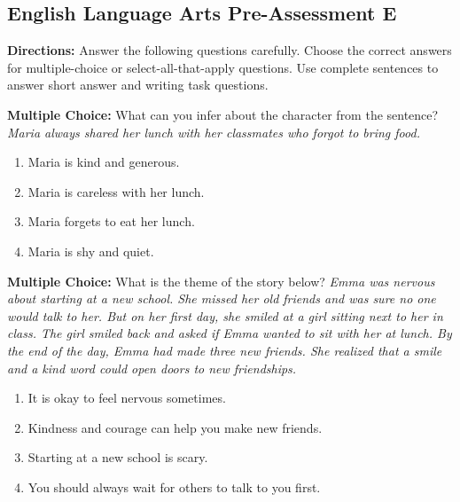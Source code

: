 \documentclass[12pt]{article}
\begin{document}
\subsection*{English Language Arts Pre-Assessment E}
\onehalfspacing

\begin{tcolorbox}[colframe=black!50, colback=white, title=Assessment Directions]
\textbf{Directions:} Answer the following questions carefully. Choose the correct answers for multiple-choice or select-all-that-apply questions. Use complete sentences to answer short answer and writing task questions.
\end{tcolorbox}

\begin{tcolorbox}[colframe=black!50, colback=white, title=Question 1]
\textbf{Multiple Choice:} What can you infer about the character from the sentence?  
\textit{Maria always shared her lunch with her classmates who forgot to bring food.}  
\begin{enumerate}[label=(\Alph*)]
\item Maria is kind and generous.
\item Maria is careless with her lunch.
\item Maria forgets to eat her lunch.
\item Maria is shy and quiet.
\end{enumerate}
\end{tcolorbox}

\begin{tcolorbox}[colframe=black!50, colback=white, title=Question 2]
\textbf{Multiple Choice:} What is the theme of the story below?  
\textit{Emma was nervous about starting at a new school. She missed her old friends and was sure no one would talk to her. But on her first day, she smiled at a girl sitting next to her in class. The girl smiled back and asked if Emma wanted to sit with her at lunch. By the end of the day, Emma had made three new friends. She realized that a smile and a kind word could open doors to new friendships.}

\begin{enumerate}[label=(\Alph*)]
\item It is okay to feel nervous sometimes.
\item Kindness and courage can help you make new friends.
\item Starting at a new school is scary.
\item You should always wait for others to talk to you first.
\end{enumerate}
\end{tcolorbox}
\end{document}
